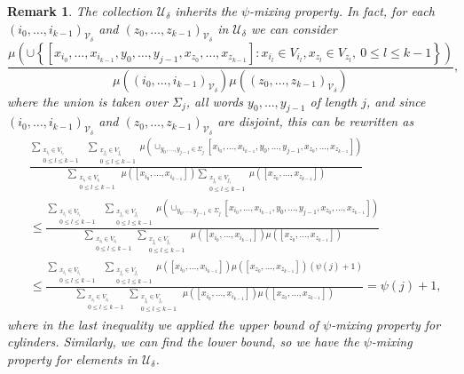 \documentclass[11pt, reqno]{amsart}
\theoremstyle{plain}%
\newtheorem{remark}[theorem]{Remark}
\theoremstyle{definition}
\theoremstyle{definition}
\def\U{\ensuremath{\mathcal U}}
\numberwithin{equation}{section}
\begin{document}
\begin{remark}\label{Remark: thida}
The collection $\U_\delta$ inherits the $\psi$-mixing property. In fact, for each $(i_0,\ldots,i_{k-1})_{\mathcal{V}_\delta}$ and $(z_0,\ldots,z_{k-1})_{\mathcal{V}_\delta}$ in $\U_\delta$ we can consider
$$ \frac{{\mu}\left(\cup\left\{[x_{i_0},\ldots,x_{i_{k-1}},y_0,\ldots,y_{j-1},x_{z_0},\ldots,x_{z_{k-1}}]:x_{i_l}\in V_{i_l},x_{z_l}\in V_{z_l},\ 0\le l\le k-1\right\}\right) }{{\mu}((i_0,\ldots,i_{k-1})_{\mathcal{V}_\delta}){\mu}((z_0,\ldots,z_{k-1})_{\mathcal{V}_\delta})},$$
where the union is taken over $\Sigma_j$, all words $y_0, \ldots, y_{j-1}$ of length $j$, and since $(i_0,\ldots,i_{k-1})_{\mathcal{V}_\delta}$ and $(z_0,\ldots,z_{k-1})_{\mathcal{V}_\delta}$ are disjoint, this can be rewritten as 
\begin{align*}
     &\frac{\sum_{\substack{x_{i_l}\in V_{i_l} \\ 0\le l\le k-1}} \ \ \sum_{{\substack{x_{j_l}\in V_{j_l} \\ 0\le l\le k-1}}}{\mu}(\cup_{y_0, \ldots, y_{j-1}\in \Sigma_j}[x_{i_0},\ldots,x_{i_{k-1}},y_0,\ldots,y_{j-1},x_{z_0},\ldots,x_{z_{k-1}}])}{\sum_{\substack{x_{i_l}\in V_{i_l} \\ 0\le l\le k-1}} \ {\mu}([x_{i_0},\ldots,x_{i_{k-1}}])\sum_{{\substack{x_{j_l}\in V_{j_l} \\ 0\le l\le k-1}}} {\mu}([x_{z_0},\ldots,x_{z_{k-1}}])}\\& \le \frac{\sum_{\substack{x_{i_l}\in V_{i_l} \\ 0\le l\le k-1}} \ \ \sum_{{\substack{x_{j_l}\in V_{j_l} \\ 0\le l\le k-1}}}{\mu}(\cup_{y_0, \ldots, y_{j-1}\in \Sigma_j}[x_{i_0},\ldots,x_{i_{k-1}},y_0,\ldots,y_{j-1},x_{z_0},\ldots,x_{z_{k-1}}])}{\sum_{\substack{x_{i_l}\in V_{i_l} \\ 0\le l\le k-1}} \sum_{{\substack{x_{j_l}\in V_{j_l} \\ 0\le l\le k-1}}}\ {\mu}([x_{i_0},\ldots,x_{i_{k-1}}]) {\mu}([x_{z_0},\ldots,x_{z_{k-1}}])}\\& \le \frac{\sum_{\substack{x_{i_l}\in V_{i_l} \\ 0\le l\le k-1}} \ \ \sum_{{\substack{x_{j_l}\in V_{j_l} \\ 0\le l\le k-1}}}{\mu}([x_{i_0},\ldots,x_{i_{k-1}}]) {\mu}([x_{z_0},\ldots,x_{z_{k-1}}])\left(\psi(j)+1\right)}{\sum_{\substack{x_{i_l}\in V_{i_l} \\ 0\le l\le k-1}} \sum_{{\substack{x_{j_l}\in V_{j_l} \\ 0\le l\le k-1}}}\ {\mu}([x_{i_0},\ldots,x_{i_{k-1}}]) {\mu}([x_{z_0},\ldots,x_{z_{k-1}}])}
     =\psi(j)+1,
\end{align*}
where in the last inequality we applied the upper bound of $\psi$-mixing property for cylinders. Similarly, we can find the lower bound, so we have the $\psi$-mixing property for elements in $\U_\delta$.

\end{remark}
\end{document}
